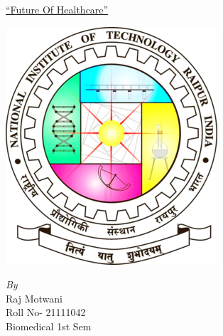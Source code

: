 \documentclass[12pt]{article}
\begin{document}
\begin{center}
\huge\underline{``Future Of Healthcare''}
\end{center}
\begin{center}
 \includegraphics[scale=0.8]{nitlogo.png }
\end{center}
\vspace{1cm}
\begin{center}
   \emph{\large By}\\
\Large{Raj Motwani }\\
\large{Roll No- 21111042}\\
\large{Biomedical 1st Sem}\\
\end{center}
\end{document}
